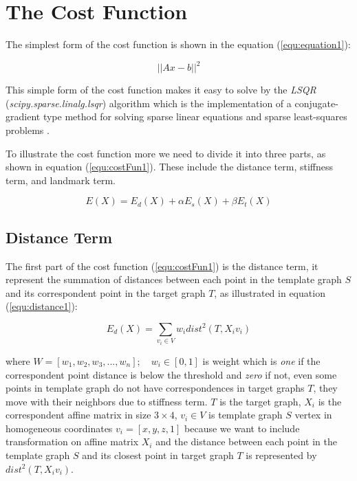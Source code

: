 \documentclass[../structure.tex]{subfiles}
\begin{document}

\section{The Cost Function}
\hspace{2em}The simplest form of the cost function is shown in the equation (\ref{equ:equation1}):

\begin{equation}
\label{equ:equation1}
||Ax-b||^2
\end{equation}

This simple form of the cost function makes it easy to solve by the \textit{LSQR} (\textit{scipy.sparse.linalg.lsqr}) algorithm which is the implementation of a conjugate-gradient type method for solving sparse linear equations and sparse least-squares problems \cite{Paige1982a}.

To illustrate the cost function more we need to divide it into three parts, as shown in equation (\ref{equ:costFun1}). These include the distance term, stiffness term, and landmark term.

\begin{equation}
E(X) = E_{d}(X) + \alpha E_{s}(X) + \beta E_{t}(X)
\label{equ:costFun1}
\end{equation}

\subsection{Distance Term}
\hspace{2em}The first part of the cost function (\ref{equ:costFun1}) is the distance term, it represent the summation of distances between each point in the template graph $S$ and its correspondent point in the target graph $T$, as illustrated in equation (\ref{equ:distance1}):

\begin{equation}
E_{d}(X) = \sum_{v_{i} \in V} w_{i}dist^2(T,X_{i}v_{i})
\label{equ:distance1}
\end{equation}

where $W = [w_{1}, w_{2}, w_{3}, ..., w_{n}];\quad w_{i}\in [0,1]$ is weight which is \textit{one} if the correspondent point distance is below the threshold and \textit{zero} if not, even some points in template graph do not have correspondences in target graphs $T$, they move with their neighbors due to stiffness term. $T$ is the target graph, $X_{i}$ is the correspondent affine matrix in size $3\times4$, $v_{i}\in V$ is template graph $S$ vertex in homogeneous coordinates $v_{i} = [x,y,z,1]$ because we want to include transformation on affine matrix $X_{i}$ and the distance between each point in the template graph $S$ and its closest point in target graph $T$ is represented by $dist^2(T,X_{i}v_{i})$.
\end{document}
